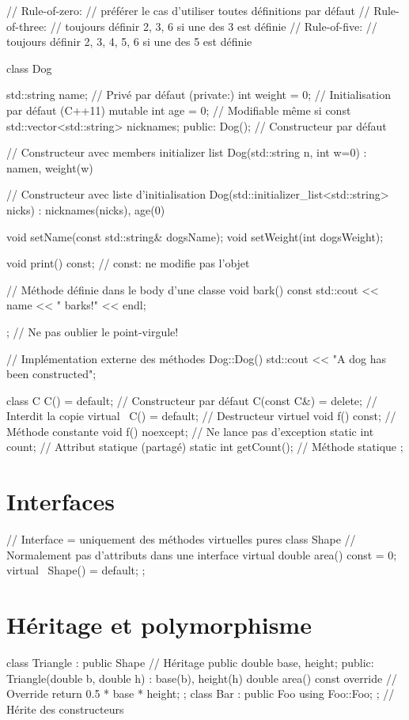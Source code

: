 \documentclass{article}
\begin{document}
\begin{multicols*}{4}
\begin{cppcode}
// Rule-of-zero:
// préférer le cas d'utiliser toutes définitions par défaut
// Rule-of-three:
// toujours définir 2, 3, 6 si une des 3 est définie
// Rule-of-five:
// toujours définir 2, 3, 4, 5, 6 si une des 5 est définie

class Dog {
    std::string name; // Privé par défaut (private:)
    int weight = 0; // Initialisation par défaut (C++11)
    mutable int age = 0; // Modifiable même si const
    std::vector<std::string> nicknames;
public:
    Dog(); // Constructeur par défaut

    // Constructeur avec members initializer list
    Dog(std::string n, int w=0) : name{n}, weight(w) {}

    // Constructeur avec liste d'initialisation
    Dog(std::initializer_list<std::string> nicks)
        : nicknames(nicks), age(0) {}

    void setName(const std::string& dogsName);
    void setWeight(int dogsWeight);

    void print() const; // const: ne modifie pas l'objet

    // Méthode définie dans le body d'une classe
    void bark() const { std::cout << name << " barks!" << endl; }

}; // Ne pas oublier le point-virgule!

// Implémentation externe des méthodes
Dog::Dog() {
    std::cout << "A dog has been constructed\n";
}

class C {
    C() = default; // Constructeur par défaut
    C(const C&) = delete; // Interdit la copie
    virtual ~C() = default; // Destructeur virtuel
    void f() const; // Méthode constante
    void f() noexcept; // Ne lance pas d'exception
    static int count; // Attribut statique (partagé)
    static int getCount(); // Méthode statique
};
\end{cppcode}

\section*{Interfaces}
\begin{cppcode}
// Interface = uniquement des méthodes virtuelles pures
class Shape {
    // Normalement pas d'attributs dans une interface
    virtual double area() const = 0;
    virtual ~Shape() = default;
};
\end{cppcode}

\section*{Héritage et polymorphisme}
\begin{cppcode}
class Triangle : public Shape { // Héritage public
    double base, height;
public:
    Triangle(double b, double h)
        : base(b), height(h) {}
    double area() const override { // Override
        return 0.5 * base * height; }
};
class Bar : public Foo {
    using Foo::Foo; }; // Hérite des constructeurs


\end{cppcode}
\end{multicols*}
\end{document}

